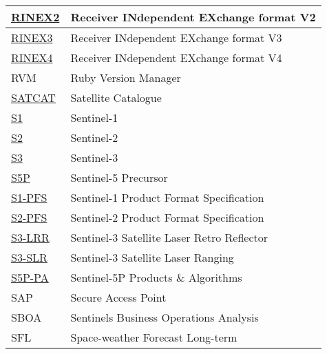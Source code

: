 \documentclass[dec_sum_main.tex]{subfiles}
\begin{document}
\begin{longtable}{|m{2.8cm}|m{10cm}|}
	\href{https://files.igs.org/pub/data/format/rinex211.txt}{RINEX2} & Receiver INdependent EXchange format V2 \\ \hline
	\href{https://files.igs.org/pub/data/format/rinex305.pdf}{RINEX3} & Receiver INdependent EXchange format V3 \\ \hline
	\href{https://files.igs.org/pub/data/format/rinex_4.00.pdf}{RINEX4} & Receiver INdependent EXchange format V4 \\ \hline	
	RVM & Ruby Version Manager \\ \hline
    \href{https://celestrak.com/satcat/search.php}{SATCAT} & Satellite Catalogue \\ \hline
	\href{https://sentinels.copernicus.eu/web/sentinel/missions/sentinel-1}{S1} & Sentinel-1 \\ \hline
	\href{https://sentinels.copernicus.eu/web/sentinel/missions/sentinel-2}{S2} & Sentinel-2 \\ \hline
	\href{https://sentinels.copernicus.eu/web/sentinel/missions/sentinel-3}{S3} & Sentinel-3 \\ \hline
    \href{https://sentinels.copernicus.eu/web/sentinel/missions/sentinel-5p}{S5P} & Sentinel-5 Precursor \\ \hline
	\href{https://sentinels.copernicus.eu/documents/247904/1877131/S1-RS-MDA-52-7441-3-9-2_Sentinel-1ProductSpecification.pdf/4f4488ef-60ad-52cb-160c-71ebdf6ca820?t=1641274625444}{S1-PFS} & Sentinel-1 Product Format Specification\\ \hline
	\href{https://sentinels.copernicus.eu/documents/247904/685211/S2-PDGS-TAS-DI-PSD-V14.9.pdf/3d3b6c9c-4334-dcc4-3aa7-f7c0deffbaf7?t=1643013091529}{S2-PFS} & Sentinel-2 Product Format Specification\\ \hline
	\href{https://sentinels.copernicus.eu/web/sentinel/technical-guides/sentinel-3-altimetry/instrument/lrr}{S3-LRR} & Sentinel-3 Satellite Laser Retro Reflector\\ \hline	
	\href{https://sentinels.copernicus.eu/web/sentinel/technical-guides/sentinel-3-altimetry/pod/slr-tracking}{S3-SLR} & Sentinel-3 Satellite Laser Ranging\\ \hline
    \href{https://sentinels.copernicus.eu/web/sentinel/technical-guides/sentinel-5p/products-algorithms}{S5P-PA} & Sentinel-5P Products \& Algorithms\\ \hline
    SAP & Secure Access Point \\ \hline
    SBOA & Sentinels Business Operations Analysis \\ \hline
	SFL & Space-weather Forecast Long-term \\ \hline

\end{longtable}
\end{document}
